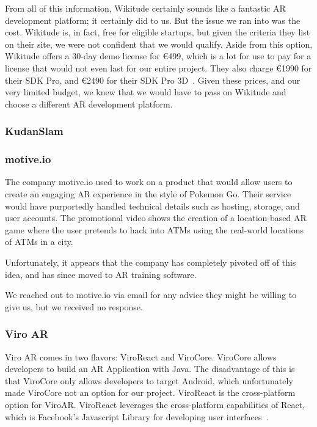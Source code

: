 \documentclass[a4paper, 10pt, american, titlepage]{article}
\begin{document}
From all of this information, Wikitude certainly sounds like a fantastic AR
development platform; it certainly did to us. But the issue we ran into was the
cost. Wikitude is, in fact, free for eligible startups, but given the criteria
they list on their site, we were not confident that we would qualify. Aside
from this option, Wikitude offers a 30-day demo license for \euro{499}, which
is a lot for use to pay for a license that would not even last for our entire
project. They also charge \euro{1990} for their SDK Pro, and \euro{2490} for
their SDK Pro 3D~\autocite{wikitude2018}. Given these prices, and our very
limited budget, we knew that we would have to pass on Wikitude and choose a
different AR development platform. 

\subsubsection{KudanSlam}
\label{sec:kudanSlam}

\subsubsection{motive.io}
\label{sec:motive.io}

The company motive.io used to work on a product that would allow users to
create an engaging AR experience in the style of Pokemon Go. Their service
would have purportedly handled technical details such as hosting, storage, and
user accounts. The promotional video shows the creation of a location-based AR
game where the user pretends to hack into ATMs using the real-world locations
of ATMs in a city\autocite{odom2017}.

Unfortunately, it appears that the company has completely pivoted off of this
idea, and has since moved to AR training software\autocite{motiveio}.

We reached out to motive.io via email for any advice they might be willing to
give us, but we received no response.

\subsubsection{Viro AR}
\label{sec:viroAR}

Viro AR comes in two flavors: ViroReact and ViroCore. ViroCore allows
developers to build an AR Application with Java. The disadvantage of this is
that ViroCore only allows developers to target Android, which unfortunately
made ViroCore not an option for our project. ViroReact is the cross-platform
option for ViroAR. ViroReact leverages the cross-platform capabilities of
React, which is Facebook's Javascript Library for developing user
interfaces~\autocite{facebook2019}.
\end{document}
